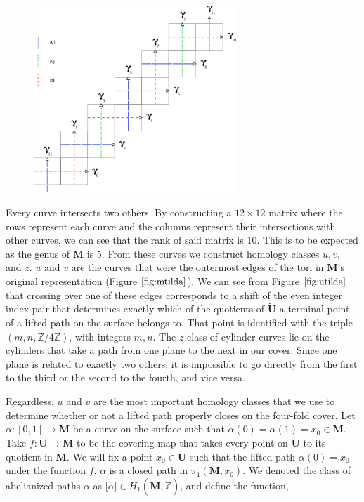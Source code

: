 \documentclass[]{article}
\begin{document}
\begin{figure}[H]
\includegraphics[width=3in]{homologyclass.png}
\centering
\end{figure}
Every curve intersects two others. By constructing a $12\times12$ matrix where the rows represent each curve and the columns represent their intersections with other curves, we can see that the rank of said matrix is 10. This is to be expected as the genus of $\mathbf M$ is 5. From these curves we construct homology classes $u,v,$ and $z$. $u$ and $v$ are the curves that were the outermost edges of the tori in $\mathbf{M}$'s original representation (Figure $\ref{fig:mtilda}$). We can see from Figure $\ref{fig:utilda}$ that crossing over one of these edges corresponds to a shift of the even integer index pair that determines exactly which of the quotients of $\tilde{\mathbf{U}}$ a terminal point of a lifted path on the surface belongs to. That point is identified with the triple $(m,n,\mathbb Z/4\mathbb{Z})$, with integers $m,n$. The $z$ class of cylinder curves lie on the cylinders that take a path from one plane to the next in our cover. Since one plane is related to exactly two others, it is impossible to go directly from the first to the third or the second to the fourth, and vice versa. 

Regardless, $u$ and $v$ are the most important homology classes that we use to determine whether or not a lifted path properly closes on the four-fold cover.  Let $\alpha:[0,1]\rightarrow\mathbf M$ be a curve on the surface such that $\alpha(0)=\alpha(1)=x_0\in\mathbf{M}$. Take $f:\tilde{\mathbf U}\rightarrow\mathbf M$ to be the covering map that takes every point on $\tilde{\mathbf U}$ to its quotient in $\mathbf{M}$. We will fix a point $\tilde{x}_0\in\tilde{\mathbf U}$ such that the lifted path $\tilde\alpha(0)=\tilde{x}_0$ under the function $f$. $\alpha$ is a closed path in $\pi_1(\mathbf M,x_0)$. We denoted the class of abelianized paths $\alpha$ as [$\alpha$]$\in H_1(\tilde{\mathbf{M}},\mathbb Z)$, and define the function,
\end{document}
